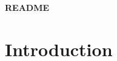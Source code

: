\documentclass[15pt]{article}
\begin{document}
\begin{center}
    \huge{\textbf{README}}
\end{center}


\section{Introduction}
\end{document}
